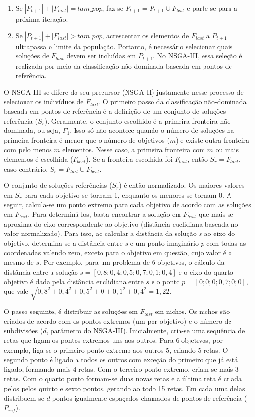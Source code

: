 \begin{enumerate}
	\item Se $|P_{t+1}| + |F_{last}| = tam\_pop$, faz-se $P_{t+1} = P_{t+1} \cup F_{last}$ e parte-se para a próxima iteração.
	\item Se $|P_{t+1}| + |F_{last}| > tam\_pop$, acrescentar os elementos de $F_{last}$ a $P_{t+1}$ ultrapassa o limite da população. Portanto, é necessário selecionar quais soluções de $F_{last}$ devem ser incluídas em $P_{t+1}$. No NSGA-III, essa seleção é realizada por meio da classificação não-dominada baseada em pontos de referência.
\end{enumerate}

O NSGA-III se difere do seu precursor (NSGA-II) justamente nesse processo de selecionar os indivíduos de $F_{last}$. O primeiro passo da classificação não-dominada baseada em pontos de referência é a definição de um conjunto de soluções referência ($S_r$). Geralmente, o conjunto escolhido é a primeira fronteira não dominada, ou seja, $F_1$. Isso só não acontece quando o número de soluções na primeira fronteira é menor que o número de objetivos ($m$) e existe outra fronteira com pelo menos $m$ elementos. Nesse caso, a primeira fronteira com $m$ ou mais elementos é escolhida ($F_{best}$). Se a fronteira escolhida foi $F_{last}$, então $S_r = F_{last}$, caso contrário, $S_r = F_{last} \cup F_{best}$.

O conjunto de soluções referências ($S_r$) é então normalizado. Os maiores valores em $S_r$ para cada objetivo se tornam 1, enquanto os menores se tornam 0. A seguir, calcula-se um ponto extremo para cada objetivo de acordo com as soluções em $F_{best}$. Para determiná-los, basta encontrar a solução em $F_{best}$ que mais se aproxima do eixo correspondente ao objetivo (distância euclidiana baseada no valor normalizado). Para isso, ao calcular a distância da solução $s$ ao eixo do objetivo, determina-se a distância entre $s$ e um ponto imaginário $p$ com todas as coordenadas valendo zero, exceto para o objetivo em questão, cujo valor é o mesmo de $s$. Por exemplo, para um problema de 6 objetivos, o cálculo da distância entre a solução $s = [0,8; 0,4; 0,5; 0,7; 0,1; 0,4]$ e o eixo do quarto objetivo é dada pela distância euclidiana entre $s$ e o ponto $p = [0; 0; 0; 0,7; 0; 0]$, que vale $\sqrt{0,8^2 + 0,4^2 + 0,5^2 + 0 + 0,1^2 + 0,4^2} = 1,22$.

O passo seguinte, é distribuir as soluções em $F_{last}$ em nichos. Os nichos são criados de acordo com os pontos extremos (um por objetivo) e o número de subdivisões ($d$, parâmetro do NSGA-III). Inicialmente, cria-se uma sequência de retas que ligam os pontos extremos uns aos outros. Para 6 objetivos, por exemplo, liga-se o primeiro ponto extremo aos outros 5, criando 5 retas. O segundo ponto é ligado a todos os outros com exceção do primeiro que já está ligado, formando mais 4 retas. Com o terceiro ponto extremo, criam-se mais 3 retas. Com o quarto ponto formam-se duas novas retas e a última reta é criada pelos pelos quinto e sexto pontos, gerando ao todo 15 retas. Em cada uma delas distribuem-se $d$ pontos igualmente espaçados chamados de pontos de referência ($P_{ref}$).

